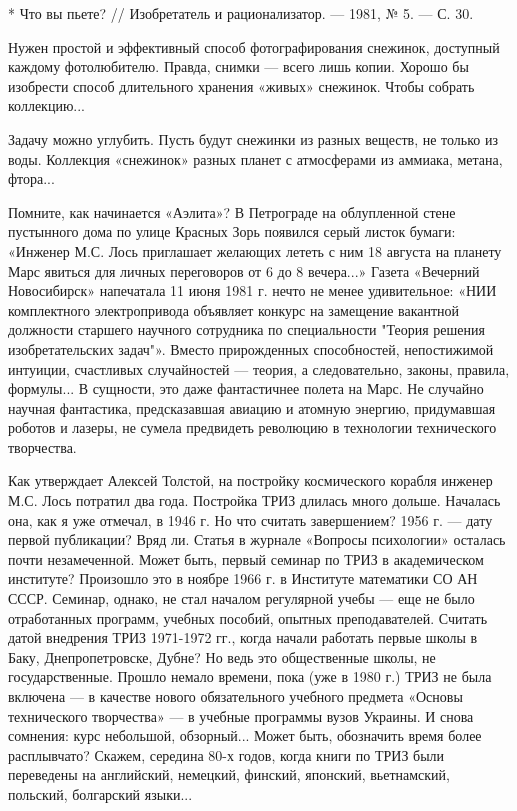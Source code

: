 * Что вы  пьете? // Изобретатель и  рационализатор. — 1981, №  5. — С.
30.

Нужен   простой  и   эффективный  способ   фотографирования  снежинок,
доступный  каждому фотолюбителю.  Правда, снимки  — всего  лишь копии.
Хорошо  бы изобрести  способ  длительного  хранения «живых»  снежинок.
Чтобы собрать коллекцию...

Задачу  можно углубить.  Пусть будут  снежинки из  разных веществ,  не
только из  воды. Коллекция «снежинок»  разных планет с  атмосферами из
аммиака, метана, фтора...


















Помните,  как   начинается  «Аэлита»?  В  Петрограде   на  облупленной
стене  пустынного дома  по улице  Красных Зорь  появился серый  листок
бумаги:  «Инженер  М.С.  Лось  приглашает желающих  лететь  с  ним  18
августа  на планету  Марс явиться  для личных  переговоров от  6 до  8
вечера...»  Газета  «Вечерний  Новосибирск» напечатала  11  июня  1981
г.  нечто  не  менее удивительное:  «НИИ  комплектного  электропривода
объявляет конкурс  на замещение вакантной должности  старшего научного
сотрудника по специальности  "Теория решения изобретательских задач"».
Вместо  прирожденных способностей,  непостижимой интуиции,  счастливых
случайностей — теория, а  следовательно, законы, правила, формулы... В
сущности, это  даже фантастичнее полета  на Марс. Не  случайно научная
фантастика,  предсказавшая  авиацию  и  атомную  энергию,  придумавшая
роботов  и  лазеры,  не   сумела  предвидеть  революцию  в  технологии
технического творчества.

Как  утверждает Алексей  Толстой,  на  постройку космического  корабля
инженер  М.С. Лось  потратил два  года. Постройка  ТРИЗ длилась  много
дольше. Началась  она, как  я уже  отмечал, в 1946  г. Но  что считать
завершением?  1956 г.  — дату  первой  публикации? Вряд  ли. Статья  в
журнале «Вопросы психологии» осталась  почти незамеченной. Может быть,
первый  семинар  по  ТРИЗ  в академическом  институте?  Произошло  это
в  ноябре  1966  г.  в  Институте  математики  СО  АН  СССР.  Семинар,
однако, не  стал началом регулярной  учебы — еще не  было отработанных
программ,  учебных  пособий,  опытных  преподавателей.  Считать  датой
внедрения ТРИЗ  1971-1972 гг.,  когда начали  работать первые  школы в
Баку,  Днепропетровске,  Дубне? Но  ведь  это  общественные школы,  не
государственные. Прошло немало  времени, пока (уже в 1980  г.) ТРИЗ не
была  включена —  в  качестве нового  обязательного учебного  предмета
«Основы технического творчества» —  в учебные программы вузов Украины.
И снова  сомнения: курс небольшой, обзорный...  Может быть, обозначить
время более расплывчато?  Скажем, середина 80-х годов,  когда книги по
ТРИЗ  были  переведены  на английский,  немецкий,  финский,  японский,
вьетнамский, польский, болгарский языки...

